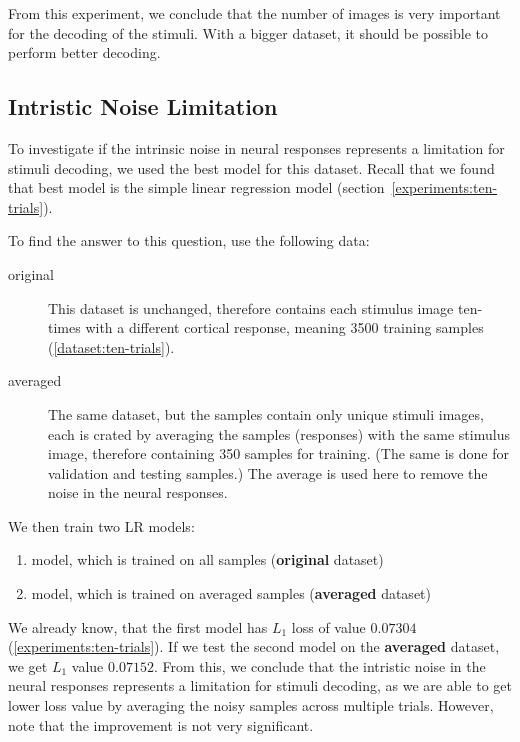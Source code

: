 From this experiment, we conclude that the number of images is very important for the decoding of the stimuli. With a bigger dataset, it should be possible to perform better decoding.


\subsection{Intristic Noise Limitation}
\label{experiments:ten-trials:intristic-noise-limitation}
To investigate if the intrinsic noise in neural responses represents a limitation for stimuli decoding, we used the best model for this dataset. Recall that we found that best model is the simple linear regression model (section~\ref{experiments:ten-trials}).

To find the answer to this question, use the following data:
\begin{description}
    \item[original] This dataset is unchanged, therefore contains each stimulus image ten-times with a different cortical response, meaning 3500 training samples (\ref{dataset:ten-trials}).
    \item[averaged] The same dataset, but the samples contain only unique stimuli images, each is crated by averaging the samples (responses) with the same stimulus image, therefore containing 350 samples for training. (The same is done for validation and testing samples.) The average is used here to remove the noise in the neural responses.
\end{description}

We then train two LR models:
\begin{enumerate}
    \item model, which is trained on all samples (\textbf{original} dataset)
    \item model, which is trained on averaged samples (\textbf{averaged} dataset)
\end{enumerate}

We already know, that the first model has $L_1$ loss of value $0.07304$ (\ref{experiments:ten-trials}). If we test the second model on the \textbf{averaged} dataset, we get $L_1$ value $0.07152$. From this, we conclude that the intristic noise in the neural responses represents a limitation for stimuli decoding, as we are able to get lower loss value by averaging the noisy samples across multiple trials. However, note that the improvement is not very significant.


